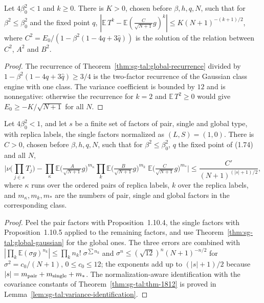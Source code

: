 \begin{theorem}
\label{thm:sg-tal:global-gaussian}
\leanok
{}
Let $4\beta_0^2<1$ and $k\ge0$. There is $K>0$, chosen before $\beta,h,q,N$, such that for
$\beta^2\le\beta_0^2$ and the fixed point $q$,
$|\mathbb E\,T^k-\mathbb E(\tfrac{C}{\sqrt{N+1}}g)^k|\le K(N+1)^{-(k+1)/2}$, where
$C^2=E_0/(1-\beta^2(1-4q+3\hat q))$ is the solution of the relation between $C^2$, $A^2$ and $B^2$.
\end{theorem}
\begin{proof}
\leanok
The recurrence of Theorem~\ref{thm:sg-tal:global-recurrence} divided by $1-\beta^2(1-4q+3\hat q)\ge3/4$
is the two-factor recurrence of the Gaussian class engine with one class. The variance coefficient
is bounded by $12$ and is nonnegative: otherwise the recurrence for $k=2$ and $\mathbb E\,T^2\ge0$
would give $E_0\ge -K/\sqrt{N+1}$ for all $N$.
\end{proof}

\begin{theorem}
\label{thm:sg-tal:thm-1101}
\leanok
{}
Let $4\beta_0^2<1$, and let $s$ be a finite set of factors of pair, single and global type, with
replica labels, the single factors normalized as $(L,S)=(1,0)$. There is $C>0$, chosen before
$\beta,h,q,N$, such that for $\beta^2\le\beta_0^2$, $q$ the fixed point of (1.74) and all $N$,
\[
 \Big|\nu\Big(\prod_{j\in s}T_j\Big)-\prod_{\kappa}\mathbb E\Big(\tfrac{A}{\sqrt{N+1}}g\Big)^{m_\kappa}
 \prod_{k}\mathbb E\Big(\tfrac{B}{\sqrt{N+1}}g\Big)^{m_k}\;
 \mathbb E\Big(\tfrac{C}{\sqrt{N+1}}g\Big)^{m_*}\Big|\le\frac{C'}{(N+1)^{(|s|+1)/2}},
\]
where $\kappa$ runs over the ordered pairs of replica labels, $k$ over the replica labels,
and $m_\kappa,m_k,m_*$ are the numbers of pair, single and global factors in the corresponding class.
\end{theorem}
\begin{proof}
\leanok
Peel the pair factors with Proposition~1.10.4, the single factors with Proposition~1.10.5 applied to the
remaining factors, and use Theorem~\ref{thm:sg-tal:global-gaussian} for the global ones. The three
errors are combined with $|\prod_k\mathbb E(\sigma g)^{n_k}|\le\prod_k n_k!\;\sigma^{\sum n_k}$ and
$\sigma^n\le(\sqrt{12})^n(N+1)^{-n/2}$ for $\sigma^2=c_0/(N+1)$, $0\le c_0\le12$; the exponents add up
to $(|s|+1)/2$ because $|s|=m_{\rm pair}+m_{\rm single}+m_*$. The normalization-aware identification with the covariance constants of
Theorem~\ref{thm:sg-tal:thm-1812} is proved in Lemma~\ref{lem:sg-tal:variance-identification}.
\end{proof}



